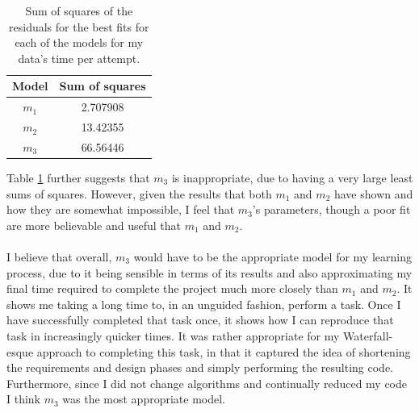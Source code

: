 \begin{table}[ht!]
\centering
\begin{tabular}{|c|c|}
\hline
{\bf Model} & Sum of squares \\
\hline
$m_1$ & 2.707908\\
\hline
$m_2$ & 13.42355\\
\hline
$m_3$ & 66.56446\\
\hline
\end{tabular}
\caption{Sum of squares of the residuals for the best fits for each of the
  models for my data's time per attempt.}
\label{table:mytimes:abc:sumsquares}
\end{table}

Table \ref{table:mytimes:abc:sumsquares} further suggests that $m_3$ is
inappropriate, due to having a very large least sums of squares.
However, given the results that both $m_1$ and $m_2$ have shown and how they are
somewhat impossible, I feel that $m_3$'s parameters, though a poor fit are more
believable and useful that $m_1$ and $m_2$.\\
\\
I believe that overall, $m_3$ would have to be the appropriate model for my
learning process, due to it being sensible in terms of its results and also
approximating my final time required to complete the project much more closely
than $m_1$ and $m_2$.
It shows me taking a long time to, in an unguided fashion, perform a task.
Once I have successfully completed that task once, it shows how I can reproduce
that task in increasingly quicker times.
It was rather appropriate for my Waterfall-esque approach to completing this
task, in that it captured the idea of shortening the requirements and design
phases and simply performing the resulting code.
Furthermore, since I did not change algorithms and continually reduced my code I
think $m_3$ was the most appropriate model.
